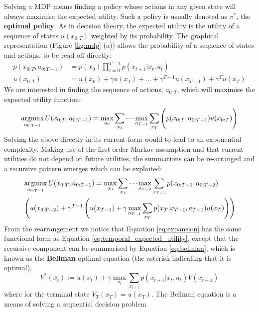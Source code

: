 Solving a MDP means finding a policy whose actions in any given state will always maximise the expected utility. Such 
a policy is usually denoted as $\pi^*$, the \textbf{optimal policy}. As in decision theory, the expected utility is the utility 
of  a sequence of states $u(x_{0:T})$ weighted by its probability. The graphical representation (Figure \ref{fig:mdp} (a)) allows 
the probability of a sequence of states and actions, to be read off directly: 
\begin{align}\label{eq:joint_state_actions}
  p(x_{0:T},a_{0:T-1}) &= p(x_{0}) \prod_{t=0}^{T-1} p(x_{t+1}|x_t,a_t) \\
  u(x_{0:T}) 	       &= u(x_0) + \gamma u(x_1) + \dots + \gamma^{T-1} u(x_{T-1})  + \gamma^T u(x_T)
\end{align}
We are interested in finding the sequence of actions, $a_{0:T}$, which will maximise the expected utility function:
\begin{equation}\label{eq:temporal_expected_utility}
 \argmax_{a_{0:T-1}} U(x_{0:T},a_{0:T-1}) = \max_{a_0} \sum\limits_{x_1}   \cdots  \max_{a_{T-1}} \sum\limits_{x_T} \Bigg( p(x_{0:T},a_{0:T-1}) u(x_{0:T}) \Bigg)
\end{equation}
Solving the above directly in its current form would to lead to an exponential complexity. Making use of the first order 
Markov assumption and that current utilities do not depend on future utilities, the summations can be re-arranged and 
a recursive pattern emerges which can be exploited: %
\begin{align}\label{eq:expansion}
 &\argmax_{a_{0:T-1}} U(x_{0:T},a_{0:T-1}) =\max_{a_0} \sum\limits_{x_1}   \cdots  \max_{a_{T-2}} \sum\limits_{x_{T-1}} p(x_{0:T-1},a_{0:T-2})  \nonumber\\
 &\left( u(x_{0:T-2}) + \gamma^{T-1} \left( u(x_{T-1}) +  \gamma \max_{a_{T-1}} \sum\limits_{x_{T}} p(x_{T}|x_{T-1},a_{T-1}) u(x_{T}) \right) \right)
\end{align}
From the rearrangement we notice that Equation \ref{eq:expansion} has the same functional form as Equation \ref{eq:temporal_expected_utility}, 
except that the recursive component can be summarised by Equation \ref{eq:bellman}, which is known as 
the \textbf{Bellman} optimal equation (the asterisk indicating that it is optimal),
\begin{equation}\label{eq:bellman}
 V^*(x_t) := u(x_t) + \gamma \max_{a_t} \sum\limits_{x_{t+1}} p(x_{t+1}|x_t,a_t) V(x_{t+1})
\end{equation}
where for the terminal state $V_T(x_T) = u(x_T)$. The Bellman equation is a means of solving a sequential decision problem 
